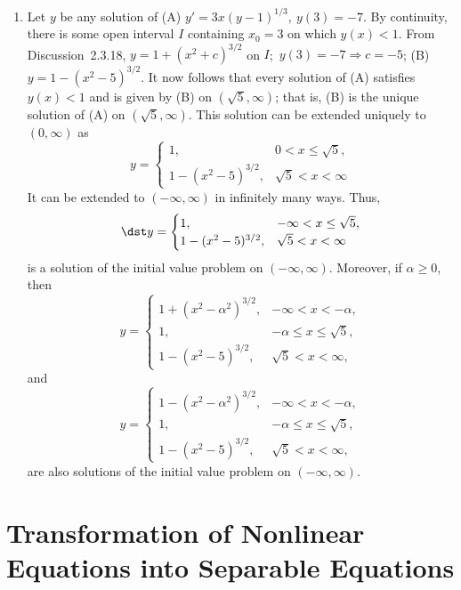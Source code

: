 \documentclass[openany]{book}
\newenvironment{sectionSolutions}{
 \begin{enumerate}[item-label={\thesection.\arabic{enumi}.}]
}{
 \end{enumerate}
}
\begin{document}
\begin{sectionSolutions}
\item
Let $y$ be any solution of (A) $y'=3x(y-1)^{1/3},\ y(3)=-7$.
By continuity, there is some open interval $I$ containing  $x_0=3$
on which $y(x)<1$. From
Discussion~2.3.18,
 $y=1+(x^2+c)^{3/2}$ on $I$;\ $y(3)=-7\Rightarrow c=-5$;\;
(B) $y=1-(x^2-5)^{3/2}$.  It now follows that every solution of (A)
satisfies $y(x)<1$
and is given by (B) on $(\sqrt5,\infty)$; that is,
(B) is the unique solution of (A) on
$(\sqrt5,\infty)$.
 This solution can be extended uniquely to
$(0,\infty)$ as
\[
y=
\begin{cases}
1, & 0< x\le\sqrt5,\\
1-(x^2-5)^{3/2}, & \sqrt5<x<\infty
\end{cases}
\]
It can be extended to $(-\infty,\infty)$ in infinitely many ways.
Thus,
\[
\dst y= \begin{cases}
 1, &-\infty< x\le\sqrt5,\\
1-(x^2-5)^{3/2},& \sqrt5<x<\infty
\end{cases}
\]
is a solution of the initial value problem on $(-\infty,\infty)$.
Moreover, if
$\alpha\ge0$, then
\[
y= \begin{cases}
 1+(x^2-\alpha^2)^{3/2},& -\infty<x<-\alpha, \\
1, & -\alpha\le x\le\sqrt5,\\
1-(x^2-5)^{3/2},& \sqrt5<x<\infty,
\end{cases}
\]
and
\[
y= \begin{cases}
 1-(x^2-\alpha^2)^{3/2},& -\infty<x<-\alpha, \\
1, & -\alpha\le x\le\sqrt5,\\
1-(x^2-5)^{3/2},& \sqrt5<x<\infty,
\end{cases}
\]
are also solutions of the initial value problem  on
$(-\infty,\infty)$.

\end{sectionSolutions}

\section{Transformation of Nonlinear Equations into Separable Equations}
\end{document}
